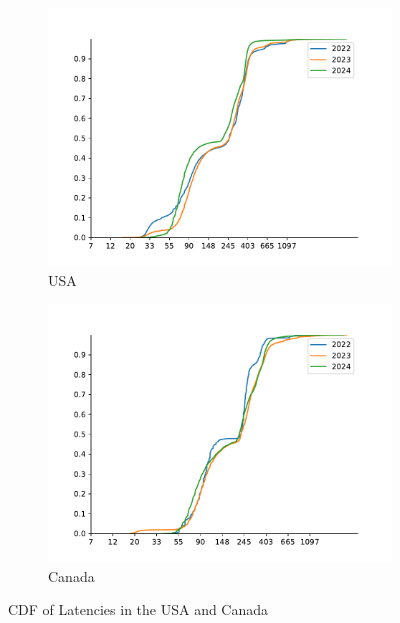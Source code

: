 \begin{figure}
	\centering
	\begin{subfigure}[b]{0.8\linewidth}
		\includegraphics[width=\linewidth]{chapters/4-results/latency/img/cdf_latencies_of_starlink_probes_in_united_states.pdf}
		\caption{USA}
	\end{subfigure}
	\begin{subfigure}[b]{0.8\linewidth}
		\includegraphics[width=\linewidth]{chapters/4-results/latency/img/cdf_latencies_of_starlink_probes_in_canada.pdf}
		\caption{Canada}
	\end{subfigure}
	\caption{CDF of Latencies in the USA and Canada}
	\label{fig:latency-cdfs-1}
\end{figure}


